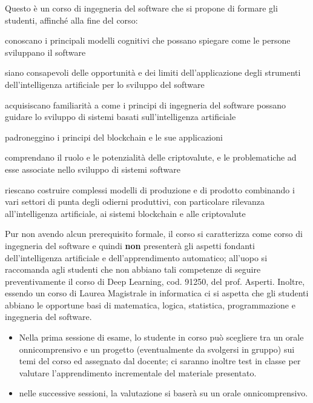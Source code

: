 \documentclass[11pt, a4paper]{article}
\begin{document}
\noindent
Questo è un corso di ingegneria del software che si propone di formare gli studenti, affinché alla fine del corso:
\begin{borderedsquare}
     \setlength\itemsep{0.3em}        
\item conoscano i principali modelli cognitivi che possano spiegare come le persone sviluppano il software
\item siano consapevoli delle opportunità e dei limiti dell’applicazione degli strumenti dell’intelligenza artificiale per lo sviluppo del software
\item acquisiscano familiarità a come i principi di ingegneria del software possano guidare lo sviluppo di sistemi basati sull’intelligenza artificiale
\item padroneggino i principi del blockchain e le sue applicazioni
\item comprendano il ruolo e le potenzialità delle criptovalute, e le problematiche ad esse associate nello sviluppo di sistemi software
\item riescano costruire complessi modelli di produzione e di prodotto combinando i vari settori di punta degli odierni produttivi, con particolare rilevanza all’intelligenza artificiale, ai sistemi blockchain e alle criptovalute
\end{borderedsquare}
        

Pur non avendo alcun prerequisito formale, il corso si caratterizza come corso di ingegneria del software e quindi \textbf{non} presenterà gli aspetti fondanti dell’intelligenza artificiale e dell’apprendimento automatico; all’uopo si raccomanda agli studenti che non abbiano tali competenze di seguire preventivamente il corso di Deep Learning, cod. 91250, del prof. Asperti. Inoltre, essendo un corso di Laurea Magistrale in informatica ci si aspetta che gli studenti abbiano le opportune basi di  matematica, logica, statistica, programmazione e ingegneria del software.


\begin{itemize}
\item Nella prima sessione di esame, lo studente in corso può scegliere tra un orale onnicomprensivo e un progetto (eventualmente da svolgersi in gruppo) sui temi del corso ed assegnato dal docente; ci saranno inoltre test in classe per valutare l'apprendimento incrementale del materiale presentato.
\item nelle successive sessioni, la valutazione si baserà su un orale onnicomprensivo.
\end{itemize}
\end{document}
